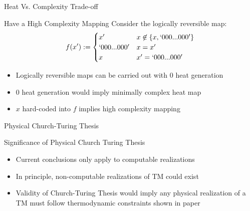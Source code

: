 \documentclass{beamer}
\begin{document}
\begin{frame}{Heat Vs. Complexity Trade-off}
\begin{block}{Have a High Complexity Mapping}
Consider the logically reversible map:
\begin{equation*}
    f(x') := \begin{cases} x' & x\not\in \{x,`000...000'\}\\
    `000...000' & x=x'\\
    x & x'= `000...000'\end{cases}
\end{equation*}
\begin{itemize}
    \item Logically reversible maps can be carried out with 0 heat generation
    \item 0 heat generation would imply minimally complex heat map
    \item $x$ hard-coded into $f$ implies high complexity mapping
\end{itemize}
\end{block}
\end{frame}

\begin{frame}{Physical Church-Turing Thesis}
\begin{block}{Significance of Physical Church Turing Thesis}
\begin{itemize}
    \item Current conclusions only apply to computable realizations
    \item In principle, non-computable realizations of TM could exist 
    \item Validity of Church-Turing Thesis would imply any physical realization of a TM must follow thermodynamic constraints shown in paper
\end{itemize}
\end{block}
\end{frame}
\end{document}

